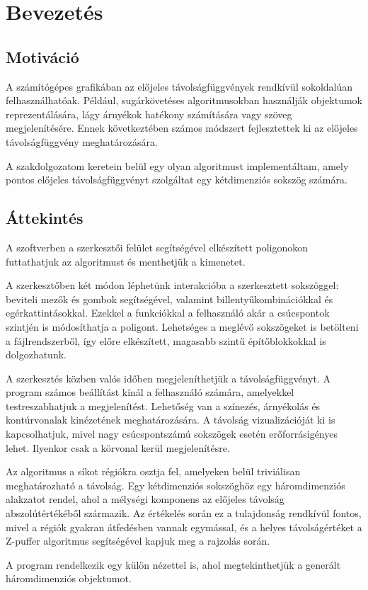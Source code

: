 \chapter{Bevezetés}
\label{ch:intro}

\section{Motiváció}\label{sec:motivacio}
A számítógépes grafikában az előjeles távolságfüggvények rendkívül sokoldalúan felhasználhatóak.
Például, sugárkövetéses algoritmusokban használják objektumok reprezentálására, lágy árnyékok hatékony számítására vagy szöveg megjelenítésére.
Ennek következtében számos módszert fejlesztettek ki az előjeles távolságfüggvény meghatározására.

A szakdolgozatom keretein belül egy olyan algoritmust implementáltam, amely pontos előjeles távolságfüggvényt szolgáltat egy kétdimenziós sokszög számára.

\section{Áttekintés}\label{sec:attekintes}
A szoftverben a szerkesztői felület segítségével elkészített poligonokon futtathatjuk az algoritmust és menthetjük a kimenetet.

A szerkesztőben két módon léphetünk interakcióba a szerkesztett sokszöggel: beviteli mezők és gombok segítségével, valamint billentyűkombinációkkal és egérkattintásokkal.
Ezekkel a funkciókkal a felhasználó akár a csúcspontok szintjén is módosíthatja a poligont.
Lehetséges a meglévő sokszögeket is betölteni a fájlrendszerből, így előre elkészített, magasabb szintű építőblokkokkal is dolgozhatunk.

A szerkesztés közben valós időben megjeleníthetjük a távolságfüggvényt.
A program számos beállítást kínál a felhasználó számára, amelyekkel testreszabhatjuk a megjelenítést.
Lehetőség van a színezés, árnyékolás és kontúrvonalak kinézetének meghatározására.
A távolság vizualizációját ki is kapcsolhatjuk, mivel nagy csúcspontszámú sokszögek esetén erőforrásigényes lehet.
Ilyenkor csak a körvonal kerül megjelenítésre.

Az algoritmus a síkot régiókra osztja fel, amelyeken belül triviálisan meghatározható a távolság.
Egy kétdimenziós sokszöghöz egy háromdimenziós alakzatot rendel, ahol a mélységi komponens az előjeles távolság abszolútértékéből származik.
Az értékelés során ez a tulajdonság rendkívül fontos, mivel a régiók gyakran átfedésben vannak egymással, és a helyes távolságértéket a Z-puffer algoritmus segítségével kapjuk meg a rajzolás során.

A program rendelkezik egy külön nézettel is, ahol megtekinthetjük a generált háromdimenziós objektumot.
